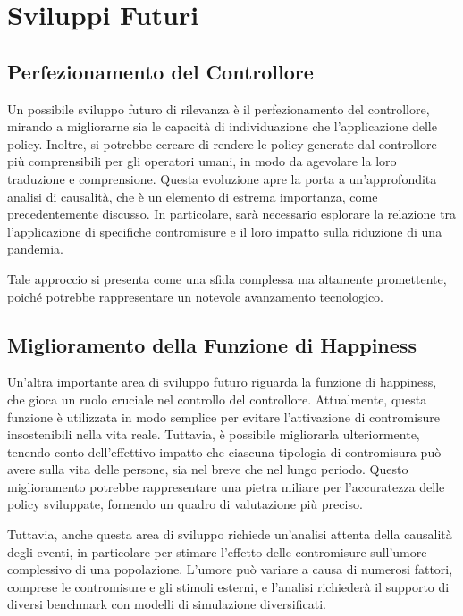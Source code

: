 \section{Sviluppi Futuri}

\subsection{Perfezionamento del Controllore}

Un possibile sviluppo futuro di rilevanza è il perfezionamento del 
controllore, mirando a migliorarne sia le capacità di individuazione 
che l'applicazione delle policy. Inoltre, si potrebbe cercare di 
rendere le policy generate dal controllore più comprensibili per 
gli operatori umani, in modo da agevolare la loro traduzione e 
comprensione. Questa evoluzione apre la porta a un'approfondita 
analisi di causalità, che è un elemento di estrema importanza, 
come precedentemente discusso. In particolare, sarà necessario 
esplorare la relazione tra l'applicazione di specifiche 
contromisure e il loro impatto sulla riduzione di una pandemia.

Tale approccio si presenta come una sfida complessa ma altamente 
promettente, poiché potrebbe rappresentare un notevole 
avanzamento tecnologico.

\subsection{Miglioramento della Funzione di Happiness}

Un'altra importante area di sviluppo futuro riguarda la funzione 
di happiness, che gioca un ruolo cruciale nel controllo del 
controllore. Attualmente, questa funzione è utilizzata in 
modo semplice per evitare l'attivazione di contromisure insostenibili 
nella vita reale. Tuttavia, è possibile migliorarla ulteriormente, 
tenendo conto dell'effettivo impatto che ciascuna tipologia di 
contromisura può avere sulla vita delle persone, sia nel breve 
che nel lungo periodo. Questo miglioramento potrebbe rappresentare 
una pietra miliare per l'accuratezza delle policy sviluppate, 
fornendo un quadro di valutazione più preciso.

Tuttavia, anche questa area di sviluppo richiede un'analisi 
attenta della causalità degli eventi, in particolare per stimare 
l'effetto delle contromisure sull'umore complessivo di una popolazione. 
L'umore può variare a causa di numerosi fattori, comprese le 
contromisure e gli stimoli esterni, e l'analisi richiederà il 
supporto di diversi benchmark con modelli di simulazione diversificati.

